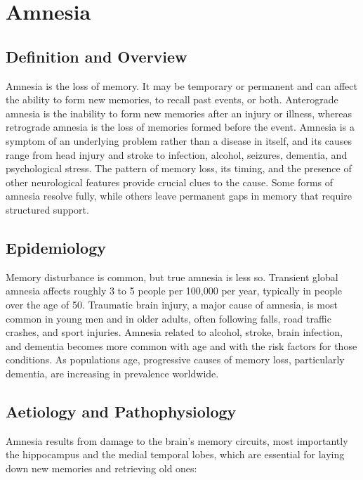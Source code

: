 \chapter{Amnesia}

\section*{Definition and Overview}
Amnesia is the loss of memory. It may be temporary or permanent and can affect the ability to form new memories, to recall past events, or both. Anterograde amnesia is the inability to form new memories after an injury or illness, whereas retrograde amnesia is the loss of memories formed before the event. Amnesia is a symptom of an underlying problem rather than a disease in itself, and its causes range from head injury and stroke to infection, alcohol, seizures, dementia, and psychological stress. The pattern of memory loss, its timing, and the presence of other neurological features provide crucial clues to the cause. Some forms of amnesia resolve fully, while others leave permanent gaps in memory that require structured support.

\section*{Epidemiology}
Memory disturbance is common, but true amnesia is less so. Transient global amnesia affects roughly 3 to 5 people per 100,000 per year, typically in people over the age of 50. Traumatic brain injury, a major cause of amnesia, is most common in young men and in older adults, often following falls, road traffic crashes, and sport injuries. Amnesia related to alcohol, stroke, brain infection, and dementia becomes more common with age and with the risk factors for those conditions. As populations age, progressive causes of memory loss, particularly dementia, are increasing in prevalence worldwide.

\section*{Aetiology and Pathophysiology}
Amnesia results from damage to the brain's memory circuits, most importantly the hippocampus and the medial temporal lobes, which are essential for laying down new memories and retrieving old ones:

